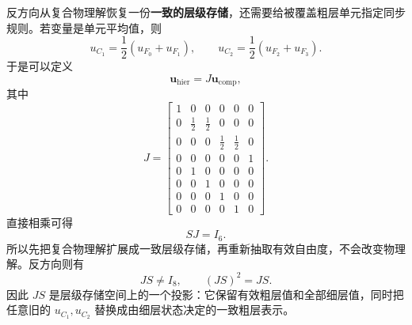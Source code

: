 反方向从复合物理解恢复一份\textbf{一致的层级存储}，还需要给被覆盖粗层单元指定同步规则。若变量是单元平均值，则
\begin{equation}
u_{C_1}=\frac12(u_{F_0}+u_{F_1}),
\qquad
u_{C_2}=\frac12(u_{F_2}+u_{F_3}).
\label{eq:amr-minimal-covered-sync}
\end{equation}
于是可以定义
\begin{equation}
\boxed{
\bm u_{\mathrm{hier}}
=
J\bm u_{\mathrm{comp}},
}
\label{eq:amr-composite-to-synchronized-storage}
\end{equation}
其中
\begin{equation}
J=
\begin{bmatrix}
1&0&0&0&0&0\\
0&\frac12&\frac12&0&0&0\\
0&0&0&\frac12&\frac12&0\\
0&0&0&0&0&1\\
0&1&0&0&0&0\\
0&0&1&0&0&0\\
0&0&0&1&0&0\\
0&0&0&0&1&0
\end{bmatrix}.
\label{eq:amr-synchronized-storage-matrix}
\end{equation}
直接相乘可得
\begin{equation}
\boxed{
SJ=I_6.
}
\label{eq:amr-selection-sync-identity}
\end{equation}
所以先把复合物理解扩展成一致层级存储，再重新抽取有效自由度，不会改变物理解。反方向则有
\begin{equation}
JS\neq I_8,
\qquad
(JS)^2=JS.
\label{eq:amr-storage-projection}
\end{equation}
因此 $JS$ 是层级存储空间上的一个投影：它保留有效粗层值和全部细层值，同时把任意旧的 $u_{C_1},u_{C_2}$ 替换成由细层状态决定的一致粗层表示。

